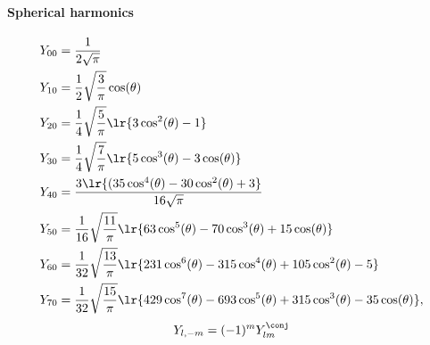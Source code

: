 \paragraph{Spherical harmonics}
%
\begin{equation}\label{eqn:qmLecture21:760}
\begin{aligned}
Y_{00} &= \frac{1}{2 \sqrt{\pi}} \\
Y_{10} &= \frac{1}{2} \sqrt{\frac{3}{\pi }} \cos(\theta) \\
Y_{20} &= \frac{1}{4} \sqrt{\frac{5}{\pi }} \lr{3 \cos^2(\theta)-1} \\
Y_{30} &= \frac{1}{4} \sqrt{\frac{7}{\pi }} \lr{5 \cos^3(\theta)-3 \cos(\theta)} \\
Y_{40} &= \frac{3 \lr{(35 \cos^4(\theta)-30 \cos^2(\theta)+3}}{16 \sqrt{\pi }} \\
Y_{50} &= \frac{1}{16} \sqrt{\frac{11}{\pi }} \lr{63 \cos^5(\theta)-70 \cos^3(\theta)+15 \cos(\theta)} \\
Y_{60} &= \frac{1}{32} \sqrt{\frac{13}{\pi }} \lr{231 \cos^6(\theta)-315 \cos^4(\theta)+105 \cos^2(\theta)-5} \\
Y_{70} &= \frac{1}{32} \sqrt{\frac{15}{\pi }} \lr{429 \cos^7(\theta)-693 \cos^5(\theta)+315 \cos^3(\theta)-35 \cos(\theta)},
\end{aligned}
\end{equation}
%
\begin{equation}\label{eqn:usefulFormulas:2580}
Y_{l,-m} = (-1)^m Y_{lm}^\conj
\end{equation}
